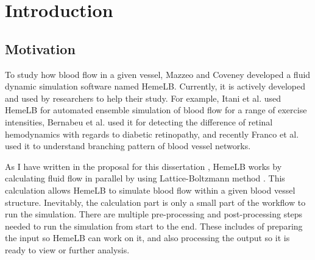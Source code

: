  

\chapter[Introduction]{Introduction}



%


\section{Motivation}
To study how blood flow in a given vessel, Mazzeo and Coveney \cite{mazzeo2008hemelb} developed a fluid dynamic simulation software named HemeLB. Currently, it is actively developed and used by researchers to help their study. For example, Itani et al. \cite{itani2015automated} used HemeLB for automated ensemble simulation of blood flow for a range of exercise intensities,  Bernabeu et al. \cite{bernabeu2015characterization} used it for detecting the difference of retinal hemodynamics with regards to diabetic retinopathy, and recently Franco et al.\cite{franco2015dynamic,franco2016non} used it to understand branching pattern of blood vessel networks.

As I have written in the proposal for this dissertation \citep{Steven:2016aa}, HemeLB works by calculating fluid flow in parallel by using Lattice-Boltzmann method \citep{mazzeo2008hemelb}. This calculation allows HemeLB to simulate blood flow within a given blood vessel structure. Inevitably, the calculation part is only a small part of the workflow to run the simulation. There are multiple pre-processing and post-processing steps needed to run the simulation from start to the end. These includes of preparing the input so HemeLB can work on it, and also processing the output so it is ready to view or further analysis.

